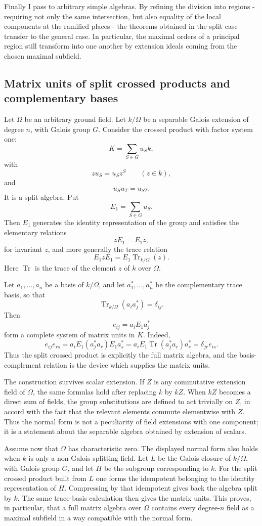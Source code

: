 \documentclass[11pt]{article}
\begin{document}
Finally I pass to arbitrary simple algebras. By refining the division into regions - requiring not only the same intersection, but also equality of the local components at the ramified places - the theorems obtained in the split case transfer to the general case. In particular, the maximal orders of a principal region still transform into one another by extension ideals coming from the chosen maximal subfield.

\subsection{Matrix units of split crossed products and complementary bases}

Let \(\Omega\) be an arbitrary ground field. Let \(k/\Omega\) be a separable Galois extension of degree \(n\), with Galois group \(G\). Consider the crossed product with factor system one:
\[
  K=\sum_{S\in G} u_S k,
\]
with
\[
  z u_S=u_S z^S\qquad(z\in k),
\]
and
\[
  u_Su_T=u_{ST}.
\]
It is a split algebra. Put
\[
  E_1=\sum_{S\in G} u_S .
\]
Then \(E_1\) generates the identity representation of the group and satisfies the elementary relations
\[
  zE_1=E_1 z,
\]
for invariant \(z\), and more generally the trace relation
\[
  E_1 z E_1=E_1\operatorname{Tr}_{k/\Omega}(z).
\]
Here \(\operatorname{Tr}\) is the trace of the element \(z\) of \(k\) over \(\Omega\).

Let \(a_1,\ldots,a_n\) be a basis of \(k/\Omega\), and let \(a_1^*,\ldots,a_n^*\) be the complementary trace basis, so that
\[
  \operatorname{Tr}_{k/\Omega}(a_i a_j^*)=\delta_{ij}.
\]
Then
\[
  e_{ij}=a_i E_1 a_j^*
\]
form a complete system of matrix units in \(K\). Indeed,
\[
  e_{ij}e_{rs}=a_iE_1(a_j^*a_r)E_1a_s^*
  =a_iE_1\operatorname{Tr}(a_j^*a_r)a_s^*
  =\delta_{jr}e_{is}.
\]
Thus the split crossed product is explicitly the full matrix algebra, and the basis-complement relation is the device which supplies the matrix units.

The construction survives scalar extension. If \(Z\) is any commutative extension field of \(\Omega\), the same formulas hold after replacing \(k\) by \(kZ\). When \(kZ\) becomes a direct sum of fields, the group substitutions are defined to act trivially on \(Z\), in accord with the fact that the relevant elements commute elementwise with \(Z\). Thus the normal form is not a peculiarity of field extensions with one component; it is a statement about the separable algebra obtained by extension of scalars.

Assume now that \(\Omega\) has characteristic zero. The displayed normal form also holds when \(k\) is only a non-Galois splitting field. Let \(L\) be the Galois closure of \(k/\Omega\), with Galois group \(G\), and let \(H\) be the subgroup corresponding to \(k\). For the split crossed product built from \(L\) one forms the idempotent belonging to the identity representation of \(H\). Compressing by that idempotent gives back the algebra split by \(k\). The same trace-basis calculation then gives the matrix units. This proves, in particular, that a full matrix algebra over \(\Omega\) contains every degree-\(n\) field as a maximal subfield in a way compatible with the normal form.
\end{document}
